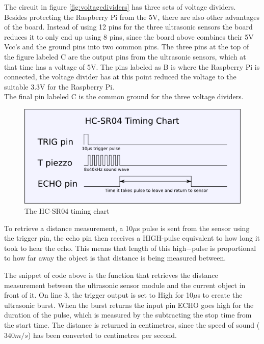 The circuit in figure \ref{fig:voltagedividers} has three sets of voltage dividers. Besides protecting the Raspberry Pi from the 5V, there are also other advantages of the board. Instead of using 12 pins for the three ultrasonic sensors the board reduces it to only end up using 8 pins, since the board above combines their 5V Vcc's and the ground pins into two common pins.  
The three pins at the top of the figure labeled C are the output pins from the ultrasonic sensors, which at that time has a voltage of 5V. The pins labeled as B is where the Raspberry Pi is connected, the voltage divider has at this point reduced the voltage to the suitable 3.3V for the Raspberry Pi. \\ 
The final pin labeled C is the common ground for the three voltage dividers.

\begin{figure}[H]
	\centering
	\includegraphics[width=.45\linewidth]{images/hcsr04timingchart.png}
	\caption{The HC-SR04 timing chart\cite{hcsr04timingchart}}
	\label{fig:timingchartpic}
\end{figure}

To retrieve a distance measurement, a 10$\mu$s pulse is sent from the sensor using the trigger pin, the echo pin then receives a HIGH-pulse equivalent to how long it took to hear the echo. This means that length of this high$-$pulse is proportional to how far away the object is that distance is being measured between\cite{ultrasonichowitworks}.



The snippet of code above is the function that retrieves the distance measurement between the ultrasonic sensor module and the current object in front of it.
On line 3, the trigger output is set to High for 10$\mu$s to create the ultrasonic burst. When the burst returns the input pin ECHO goes high for the duration of the pulse, which is measured by the subtracting the stop time from the start time.
The distance is returned in centimetres, since the speed of sound ($340m/s$) has been converted to centimetres per second.
